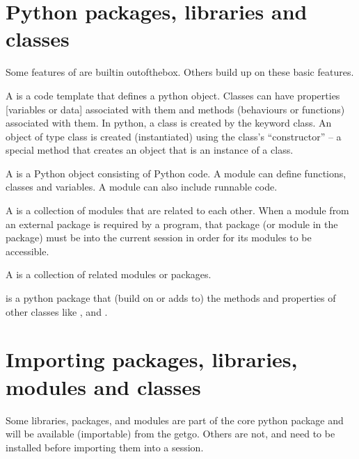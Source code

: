 \documentclass[letterpaper,10pt,english]{jupyterBook}
\begin{document}
\section{Python  packages, libraries and classes}
\label{\detokenize{content/04_PythonEssentials/PythonPandasDataframes:python-packages-libraries-and-classes}}
\sphinxAtStartPar
Some features of  are built\sphinxhyphen{}in out\sphinxhyphen{}of\sphinxhyphen{}the\sphinxhyphen{}box.  Others build up on these basic features.

\sphinxAtStartPar
A  is a code template that defines a python object. Classes can have properties {[}variables or data{]} associated with them and methods (behaviours or functions) associated with them. In python, a class is created by the keyword class. An object of type class is created (instantiated) using the class’s “constructor” – a special method that creates an object that is an instance of a class.

\sphinxAtStartPar
A  is a Python object consisting of Python code. A module can define functions, classes and variables. A module can also include runnable code.

\sphinxAtStartPar
A  is a collection of modules that are related to each other. When a module from an external package is required by a program, that package (or module in the package) must  be  into the current session in order for its modules to be accessible.

\sphinxAtStartPar
A  is a collection of related modules or packages.

\sphinxAtStartPar
{} is a python package that  (build on or adds to) the methods and properties of other  classes like ,  and .


\section{Importing packages, libraries, modules and classes}
\label{\detokenize{content/04_PythonEssentials/PythonPandasDataframes:importing-packages-libraries-modules-and-classes}}
\sphinxAtStartPar
Some libraries, packages, and modules are part of the core python package and will be available (importable) from the get\sphinxhyphen{}go.  Others are not, and need to be installed before importing them into a session.
\end{document}
